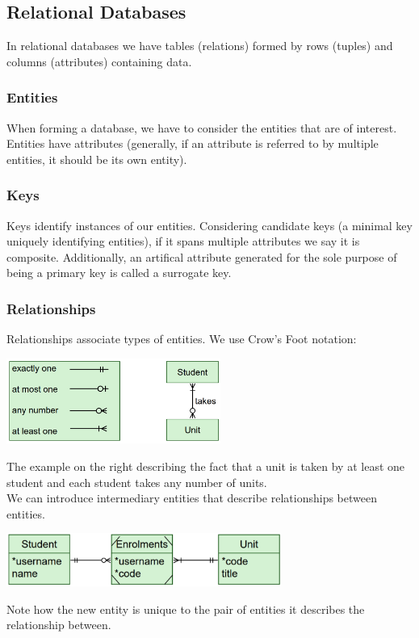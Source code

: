 \newpage

\subsection{Relational Databases}

In relational databases we have tables (relations) formed by
rows (tuples) and columns (attributes) containing data.

\subsubsection{Entities}

When forming a database, we have to consider the entities
that are of interest. Entities have attributes (generally,
if an attribute is referred to by multiple entities, it
should be its own entity).

\subsubsection{Keys}

Keys identify instances of our entities. Considering candidate keys
(a minimal key uniquely identifying entities), if it spans multiple
attributes we say it is composite. Additionally, an artifical
attribute generated for the sole purpose of being a primary key
is called a surrogate key.

\subsubsection{Relationships}

Relationships associate types of entities. We use Crow's Foot
notation:
\begin{center}
    \includegraphics[width = 7cm]{crowsfoot.PNG}
\end{center} The example on the right describing the fact that a
unit is taken by at least one student and each student takes
any number of units.
\\[\baselineskip]
We can introduce intermediary entities that describe relationships
between entities. \begin{center}
    \includegraphics[width = 9cm]{associative.PNG}
\end{center} Note how the new entity is unique to the 
pair of entities it describes the relationship between.

